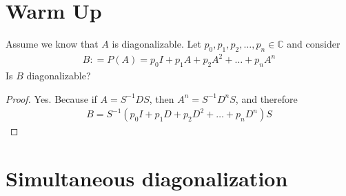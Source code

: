 

\section{Warm Up}
Assume we know that $A$ is diagonalizable. Let $p_0, p_1 , p_2 ,
\ldots , p_n \in \mathbb{C}$ and consider
\begin{align*}
  B: = P(A) = p_0 I + p_1 A + p_2A^2 + \ldots + p_nA^n
\end{align*}
Is $B$ diagonalizable?
\begin{proof}
  Yes. Because if $A = S^{-1}DS$, then $A^n = S^{-1}D^n S$, and therefore
  \begin{align*}
    B = S^{-1} (p_0 I  + p_1D + p_2D^2 + \ldots + p_nD^n)S
  \end{align*}
\end{proof}

\section{Simultaneous diagonalization}

